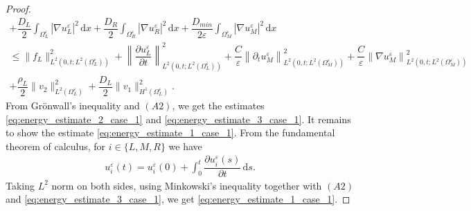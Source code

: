 \documentclass[11pt]{article}
\def\es{\varepsilon}
\def\orr{\Omega_R^\varepsilon}
\def\omm{\Omega_M^\varepsilon}
\def\oll{\Omega_L^\varepsilon}
\newcommand{\di}[1]{\,\mathrm{d}#1}
\begin{document}
\begin{proof}
\begin{multline*}
   + \dfrac{D_L}{2}\int_{\oll}|\nabla u_L^\es|^2\di{x}+
   \dfrac{D_R}{2}\int_{\orr}|\nabla u_R^\es|^2\di{x}
   +\dfrac{D_{min}}{2\es}\int_{\omm} |\nabla u_M^\es|^2 \di{x}\\
     \leq \|f_L\|_{L^2(0,t;L^2(\oll))}^2+\left\|\dfrac{\partial u_L^\es}{\partial t}\right\|_{L^2(0,t;L^2(\oll))}^2+\dfrac{C}{\es}\left\|\partial_tu_M^\es\right\|_{L^2(0,t;L^2(\omm))}^2+\dfrac{C}{\es}\left\|\nabla u_M^\es\right\|_{L^2(0,t;L^2(\omm))}^2\\
     +\dfrac{\rho_L}{2}\|v_2\|_{L^2(\oll)}^2+\dfrac{D_L}{2}\|v_1\|_{H^1(\oll)}^2.
\end{multline*}
From Grönwall's inequality and $(A2)$, we get the estimates \eqref{eq:energy_estimate_2_case_1} and \eqref{eq:energy_estimate_3_case_1}. It remains to show the estimate \eqref{eq:energy_estimate_1_case_1}. 
 From the fundamental theorem of calculus, for $i\in\{L,M,R\}$ we have
    \begin{align*}
        u_i^\es(t)=u_i^\es(0)+\int_0^t \dfrac{\partial u_i^\es(s)}{\partial t}\di{s}.
    \end{align*}
    Taking $L^2$ norm on both sides, using Minkowski's inequality together with $(A2)$ and \eqref{eq:energy_estimate_3_case_1}, we get \eqref{eq:energy_estimate_1_case_1}.
	\end{proof}
\end{document}
